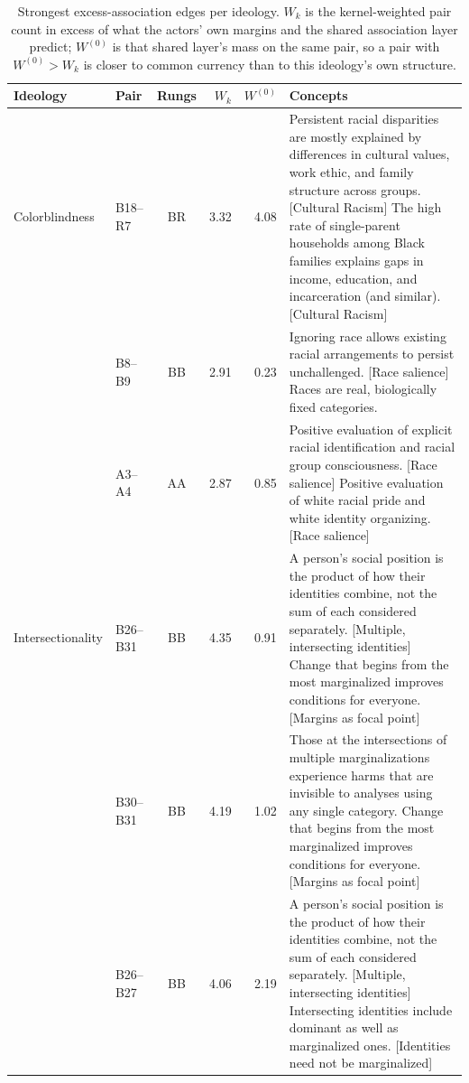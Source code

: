 \begin{table}[t]
\centering
\small
\caption{Strongest excess-association edges per ideology. $W_k$ is the kernel-weighted pair count in excess of what the actors' own margins and the shared association layer predict; $W^{(0)}$ is that shared layer's mass on the same pair, so a pair with $W^{(0)} > W_k$ is closer to common currency than to this ideology's own structure.}
\label{tab:top-edges}
\begin{tabular}{llcrr>{\raggedright\arraybackslash}p{7.2cm}}
\toprule
Ideology & Pair & Rungs & $W_k$ & $W^{(0)}$ & Concepts \\
\midrule
Colorblindness & B18--R7 & BR & 3.32 & 4.08 & Persistent racial disparities are mostly explained by differences in cultural values, work ethic, and family structure across groups. [Cultural Racism] \newline The high rate of single-parent households among Black families explains gaps in income, education, and incarceration (and similar). [Cultural Racism] \\
 & B8--B9 & BB & 2.91 & 0.23 & Ignoring race allows existing racial arrangements to persist unchallenged. [Race salience] \newline Races are real, biologically fixed categories. \\
 & A3--A4 & AA & 2.87 & 0.85 & Positive evaluation of explicit racial identification and racial group consciousness. [Race salience] \newline Positive evaluation of white racial pride and white identity organizing. [Race salience] \\
\addlinespace
Intersectionality & B26--B31 & BB & 4.35 & 0.91 & A person's social position is the product of how their identities combine, not the sum of each considered separately. [Multiple, intersecting identities] \newline Change that begins from the most marginalized improves conditions for everyone. [Margins as focal point] \\
 & B30--B31 & BB & 4.19 & 1.02 & Those at the intersections of multiple marginalizations experience harms that are invisible to analyses using any single category. \newline Change that begins from the most marginalized improves conditions for everyone. [Margins as focal point] \\
 & B26--B27 & BB & 4.06 & 2.19 & A person's social position is the product of how their identities combine, not the sum of each considered separately. [Multiple, intersecting identities] \newline Intersecting identities include dominant as well as marginalized ones. [Identities need not be marginalized] \\
\bottomrule
\end{tabular}
\end{table}
